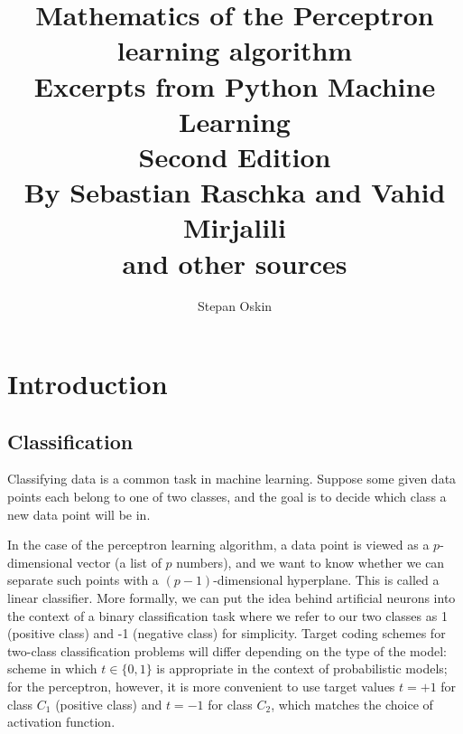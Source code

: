 \documentclass[11pt]{article}
\begin{document}
    \title{Mathematics of the Perceptron learning algorithm\\
    Excerpts from Python Machine Learning \\
    Second Edition \\
    By Sebastian Raschka and Vahid Mirjalili\cite{RaschkaMirjalili2017} \\
    and other sources}

    \author{Stepan Oskin}

    \maketitle

    \begin{abstract}


    \end{abstract}

    \section{Introduction} \label{sec:perc_intro}

    \subsection{Classification} \label{subsec:classification}

    Classifying data is a common task in machine learning.
    Suppose some given data points each belong to one of two classes, and the goal is to decide which class a
    new data point will be in.

    In the case of the perceptron learning algorithm, a data point is viewed as a $p$-dimensional vector
    (a list of $p$ numbers), and we want to know whether we can separate such points with
    a $(p-1)$-dimensional hyperplane.
    This is called a linear classifier.
    More formally, we can put the idea behind artificial neurons into the context of a binary classification task where we refer to our two classes as 1 (positive class) and -1 (negative class) for simplicity.
    Target coding schemes for two-class classification problems will differ depending on the type of the model: scheme in which $t \in \{0, 1\}$ is appropriate in the context of probabilistic models;
    for the perceptron, however, it is more convenient to use target values $t = +1$ for class $C_1$ (positive class) and $t = -1$ for class $C_2$, which matches the choice of activation function\cite{Bishop2006}.
\end{document}
